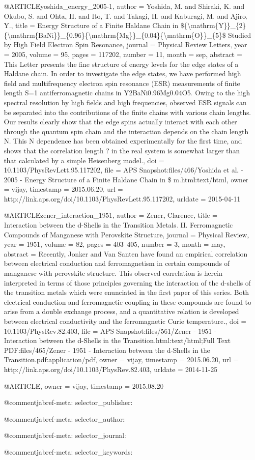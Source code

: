 @ARTICLE{yoshida_energy_2005-1,
  author = {Yoshida, M. and Shiraki, K. and Okubo, S. and Ohta, H. and Ito, T.
	and Takagi, H. and Kaburagi, M. and Ajiro, Y.},
  title = {Energy {Structure} of a {Finite} {Haldane} {Chain} in \$\{{\textbackslash}mathrm\{{Y}\}\}\_\{2\}\{{\textbackslash}mathrm\{{BaNi}\}\}\_\{0.96\}\{{\textbackslash}mathrm\{{Mg}\}\}\_\{0.04\}\{{\textbackslash}mathrm\{{O}\}\}\_\{5\}\$
	{Studied} by {High} {Field} {Electron} {Spin} {Resonance}},
  journal = {Physical Review Letters},
  year = {2005},
  volume = {95},
  pages = {117202},
  number = {11},
  month = sep,
  abstract = {This Letter presents the fine structure of energy levels for the edge
	states of a Haldane chain. In order to investigate the edge states,
	we have performed high field and multifrequency electron spin resonance
	(ESR) measurements of finite length S=1 antiferromagnetic chains
	in Y2BaNi0.96Mg0.04O5. Owing to the high spectral resolution by high
	fields and high frequencies, observed ESR signals can be separated
	into the contributions of the finite chains with various chain lengths.
	Our results clearly show that the edge spins actually interact with
	each other through the quantum spin chain and the interaction depends
	on the chain length N. This N dependence has been obtained experimentally
	for the first time, and shows that the correlation length ? in the
	real system is somewhat larger than that calculated by a simple Heisenberg
	model.},
  doi = {10.1103/PhysRevLett.95.117202},
  file = {APS Snapshot:files/466/Yoshida et al. - 2005 - Energy Structure of a Finite Haldane Chain in \$ m.html:text/html},
  owner = {vijay},
  timestamp = {2015.06.20},
  url = {http://link.aps.org/doi/10.1103/PhysRevLett.95.117202},
  urldate = {2015-04-11}
}

@ARTICLE{zener_interaction_1951,
  author = {Zener, Clarence},
  title = {Interaction between the d-{Shells} in the {Transition} {Metals}.
	{II}. {Ferromagnetic} {Compounds} of {Manganese} with {Perovskite}
	{Structure}},
  journal = {Physical Review},
  year = {1951},
  volume = {82},
  pages = {403--405},
  number = {3},
  month = may,
  abstract = {Recently, Jonker and Van Santen have found an empirical correlation
	between electrical conduction and ferromagnetism in certain compounds
	of manganese with perovskite structure. This observed correlation
	is herein interpreted in terms of those principles governing the
	interaction of the d-shells of the transition metals which were enunciated
	in the first paper of this series. Both electrical conduction and
	ferromagnetic coupling in these compounds are found to arise from
	a double exchange process, and a quantitative relation is developed
	between electrical conductivity and the ferromagnetic Curie temperature.},
  doi = {10.1103/PhysRev.82.403},
  file = {APS Snapshot:files/561/Zener - 1951 - Interaction between the d-Shells in the Transition.html:text/html;Full Text PDF:files/465/Zener - 1951 - Interaction between the d-Shells in the Transition.pdf:application/pdf},
  owner = {vijay},
  timestamp = {2015.06.20},
  url = {http://link.aps.org/doi/10.1103/PhysRev.82.403},
  urldate = {2014-11-25}
}

@ARTICLE{,
  owner = {vijay},
  timestamp = {2015.08.20}
}

@comment{jabref-meta: selector_publisher:}

@comment{jabref-meta: selector_author:}

@comment{jabref-meta: selector_journal:}

@comment{jabref-meta: selector_keywords:}

